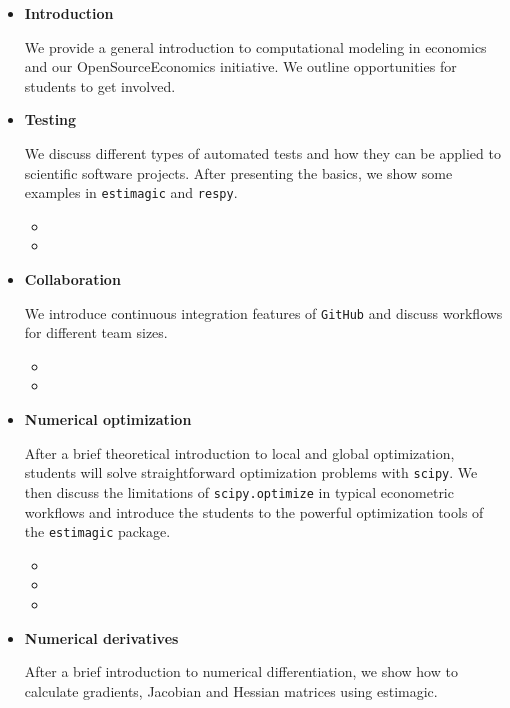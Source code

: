\begin{itemize}

\item \textbf{Introduction}

We provide a general introduction to computational modeling in economics and our OpenSourceEconomics initiative. We outline opportunities for students to get involved.

\item \textbf{Testing}

We discuss different types of automated tests and how they can be applied to scientific software projects. After presenting the basics, we show some examples in \verb+estimagic+ and \verb+respy+.

\begin{itemize}
  \item {}
  \item {}
\end{itemize}


\item \textbf{Collaboration}

We introduce continuous integration features of \verb+GitHub+ and discuss workflows for different team sizes.

\begin{itemize}
  \item {}
  \item {}
\end{itemize}

\item \textbf{Numerical optimization}

After a brief theoretical introduction to local and global optimization, students will solve straightforward optimization problems with \verb+scipy+. We then discuss the limitations of \verb+scipy.optimize+ in typical econometric workflows and introduce the students to the powerful optimization tools of the \verb+estimagic+ package.

\begin{itemize}
  \item {}
  \item {}
  \item {}
\end{itemize}

\item \textbf{Numerical derivatives}

After a brief introduction to numerical differentiation, we show how to calculate gradients, Jacobian and Hessian matrices using estimagic.


\end{itemize}
